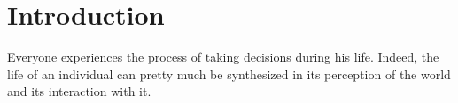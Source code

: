 \chapter{Introduction}
Everyone experiences the process of taking decisions during his life. Indeed, the life of an individual can pretty much be synthesized in its perception of the world and its interaction with it. 
